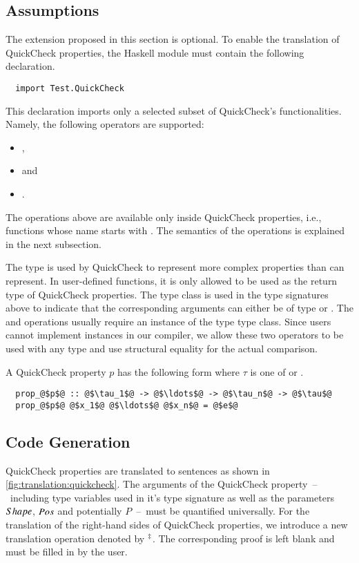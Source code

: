 \subsection{Assumptions} \label{sec:translation:quickcheck:assumptions}
The extension proposed in this section is optional.
To enable the translation of QuickCheck properties, the Haskell module must contain the following  declaration.
\begin{verbatim}
  import Test.QuickCheck
\end{verbatim}
This  declaration imports only a selected subset of QuickCheck's functionalities.
Namely, the following operators are supported:
\begin{itemize}
  \item {},
  \item {} and
  \item {}.
\end{itemize}
The operations above are available only inside QuickCheck properties, i.e., functions whose name starts with .
The semantics of the operations is explained in the next subsection.

The type  is used by QuickCheck to represent more complex properties than  can represent.
In user-defined functions, it is only allowed to be used as the return type of QuickCheck properties.
The type class  is used in the type signatures above to indicate that the corresponding arguments can either be of type  or .
The \haskell{(===)} and \haskell{(=/=)} operations usually require an instance of the type  type class.
Since users cannot implement  instances in our compiler, we allow these two operators to be used with any type and use structural equality for the actual comparison.

A QuickCheck property $p$ has the following form where $\tau$ is one of  or .
\begin{verbatim}
  prop_@$p$@ :: @$\tau_1$@ -> @$\ldots$@ -> @$\tau_n$@ -> @$\tau$@
  prop_@$p$@ @$x_1$@ @$\ldots$@ @$x_n$@ = @$e$@
\end{verbatim}

\subsection{Code Generation} \label{sec:translation:quickcheck:code-generation}
QuickCheck properties are translated to  sentences as shown in \autoref{fig:translation:quickcheck}.
The arguments of the QuickCheck property~--~including type variables used in it's type signature as well as the parameters $Shape$, $Pos$ and potentially $P$~--~must be quantified universally.
For the translation of the right-hand sides of QuickCheck properties, we introduce a new translation operation denoted by ${}^{\ddag}$.
The corresponding proof is left blank and must be filled in by the user.

